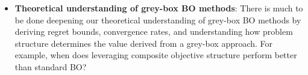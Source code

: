 \documentclass{wscpaperproc}
\theoremstyle{wsc}
\begin{document}
\begin{itemize}
\item \textbf{Theoretical understanding of grey-box BO methods}: 
There is much to be done deepening our theoretical understanding of grey-box BO methods by deriving regret bounds, convergence rates, and  understanding how problem structure determines the value derived from a grey-box approach. For example, %
when does leveraging composite objective structure perform better than standard BO?
\end{itemize}



{\footnotesize


}
\end{document}
